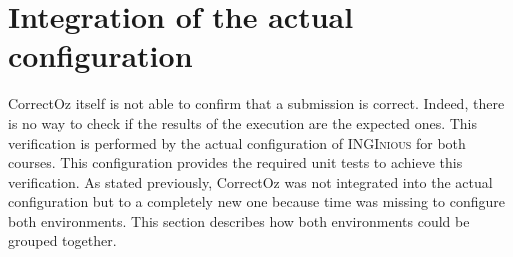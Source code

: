 \documentclass[11pt,a4paper,twoside,openright]{report}
\begin{document}
% 
% 	
% 

%

\newpage
\section{Integration of the actual configuration} 
\label{sec:unit_test_remaining}

CorrectOz itself is not able to confirm that a submission is correct. Indeed, 
there is no way to check if the results of the execution are the expected ones. 
This verification is performed by the actual configuration of 
\textsc{INGInious} for both courses. This configuration provides the required 
unit tests to achieve this verification. As stated previously, CorrectOz 
was not integrated into the actual configuration but to a completely new 
one because time was missing to configure both environments. This 
section describes how both environments could be grouped together.\\
\end{document}

